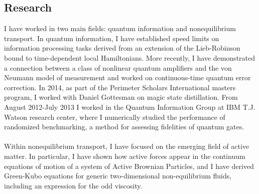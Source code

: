 \documentclass[]{article}
\begin{document}
\subsection*{Research}
I have worked in two main fields: quantum information and nonequilibrium transport.  In quantum information, I have established speed limits on information processing tasks derived from an extension of the Lieb-Robinson bound to time-dependent local Hamiltonians. More recently, I have demonstrated a connection between a class of nonlinear quantum amplifiers and the von Neumann model of measurement and worked on continuous-time quantum error correction. In 2014, as part of the Perimeter Scholars International masters program, I worked with Daniel Gottesman on magic state distillation. From August 2012-July 2013 I worked in the Quantum Information Group at IBM T.J. Watson research center, where I numerically studied the performance of randomized benchmarking, a method for assessing fidelities of quantum gates.\\
\\
Within nonequilibrium transport, I have focused on the emerging field of active matter. In particular, I have shown how active forces appear in the continuum equations of motion of a system of Active Brownian Particles, and I have derived Green-Kubo equations for generic two-dimensional non-equilibrium fluids, including an expression for the odd viscosity.
\end{document}
